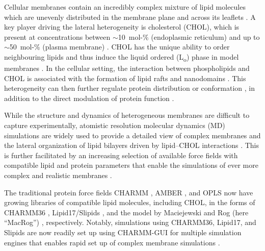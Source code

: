 \documentclass[journal=jctcce]{achemso}
\begin{document}
Cellular membranes contain an incredibly complex mixture of lipid molecules \cite{lorent2020plasma} which are unevenly distributed in the membrane plane and across its leaflets \cite{van2008membrane,wang2020membrane,kinnun2020lateral}. A key player driving the lateral heterogeneity is cholesterol (CHOL), which is present at concentrations between $\sim$10~mol-\% (endoplasmic reticulum) and up to $\sim$50~mol-\% (plasma membrane) \cite{van2008membrane}. CHOL has the unique ability to order neighbouring lipids and thus induce the liquid ordered (L\textsubscript{o}) phase in model membranes \cite{mouritsen2004s,ipsen87,kinnunen91,rog2009ordering}. In the cellular setting, the interaction between phospholipids and CHOL is associated with the formation of lipid rafts and nanodomains \cite{Simons97,cebecauer2018membrane}. This heterogeneity can then further regulate protein distribution \cite{milovanovic2015hydrophobic} or conformation \cite{kelkar2007modulation}, %
in addition to the direct modulation of protein function \cite{gimpl2016interaction,guixa2017membrane}.

While the structure and dynamics of heterogeneous membranes are difficult to capture experimentally, atomistic resolution molecular dynamics (MD) simulations are widely used to provide a detailed view of complex membranes and the lateral organization of lipid bilayers driven by lipid--CHOL interactions \cite{rog14,rog2009ordering,berkowitz2009detailed,enkavi2019multiscale,marrink2019computational}. This is further facilitated by an increasing selection of available force fields with compatible lipid and protein parameters that enable the simulations of ever more complex and realistic membranes . 

The traditional protein force fields CHARMM \cite{brooks1983charmm}, AMBER \cite{cornell1995second}, and OPLS \cite{jorgensen1988opls,harder2016opls3} now have growing libraries of compatible lipid molecules, including CHOL, in the forms of CHARMM36 \cite{Klauda06,lim12}, Lipid17/Slipids \cite{dickson14,madej15,jambeck12,jambeck12b,jambeck13b,grote2020optimization}, and the model by Maciejewski and Rog (here ``MacRog'') \cite{maciejewski14,kulig14,kulig15,Kulig15b}, respectively. Notably, simulations using CHARMM36, Lipid17, and Slipids are now readily set up using CHARMM-GUI for multiple simulation engines that enables rapid set up of complex membrane simulations \cite{lee16,lee2020charmm}. 
\end{document}
